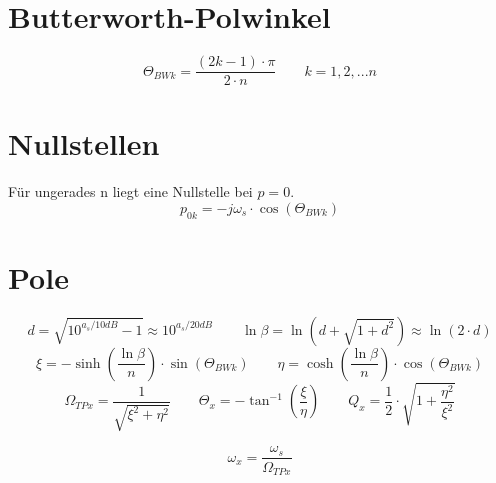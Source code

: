 \documentclass[a4paper, 12pt]{report}
\begin{document}
\section*{Butterworth-Polwinkel}
	\[ \varTheta_{BWk} = \frac{(2k-1)\cdot \pi}{2 \cdot n} \qquad k = 1,2,...n \]
\section*{Nullstellen}
	Für ungerades n liegt eine Nullstelle bei $ p = 0 $.
	\[ p_{0k} = -j\omega_s\cdot\cos{\left(\varTheta_{BWk}\right)} \]
	
\section*{Pole}
	\[ d = \sqrt{10^{a_s/10dB} - 1} \approx 10^{a_s / 20dB} \qquad \ln \beta = \ln \left( d + \sqrt{1 + d^2}\right) \approx \ln \left( 2 \cdot d\right) \]
	\vspace{0cm}
	\[ \xi = - \sinh \left(\frac{\ln \beta}{n}\right) \cdot \sin \left(\varTheta_{BWk} \right) \qquad \eta = \cosh \left(\frac{\ln \beta}{n}\right) \cdot \cos \left(\varTheta_{BWk}\right)\]
	\vspace{0cm}
	\[ \Omega_{TPx} = \frac{1}{\sqrt{\xi^2 + \eta^2}} \qquad \varTheta_{x} = -\tan^{-1}\left(\frac{\xi}{\eta}\right) \qquad Q_{x} = \frac{1}{2} \cdot \sqrt{1 + \frac{\eta^2}{\xi^2}} \]
	
	\[ \omega_x = \frac{\omega_s}{\Omega_{TPx}} \]
	
\clearpage
   	
\end{document}
